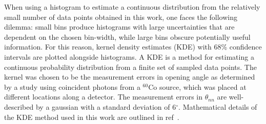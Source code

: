 \documentclass[%
 reprint,
 amsmath,amssymb,
 aps,
 nofootinbib
]{revtex4-1}
\begin{document}
When using a histogram to estimate a continuous distribution from the relatively small number of data points obtained in this work, one faces the following dilemma: small bins produce histograms with large uncertainties that are dependent on the chosen bin-width, while large bins obscure potentially useful information. 
For this reason, kernel density estimates (KDE) with 68\% confidence intervals are plotted alongside histograms.
A KDE is a method for estimating a continuous probability distribution from a finite set of sampled data points.
The kernel was chosen to be the measurement errors in opening angle as determined by a study using coincident photons from a $^{60}$Co source, which was placed at different locations along a detector.
The measurement errors in $\theta_{nn}$ are well-described by a gaussian with a standard deviation of 6$^{\circ}$.
Mathematical details of the KDE method used in this work are outlined in ref~\cite{KDE}. 
\end{document}
